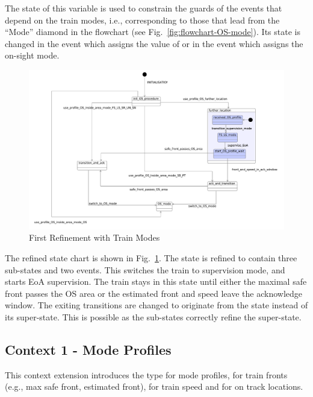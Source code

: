 \documentclass{template/openetcs_article}
\begin{document}
The state of this variable is used to constrain the guards of the events that
depend on the train modes, i.e., corresponding to those that lead from the
``Mode'' diamond in the flowchart (see Fig.~\ref{fig:flowchart-OS-mode}).
Its state is changed in the  event
which assigns the value of  or in the
 event which assigns the on-sight mode.

\begin{figure}[ht]
  \centering
  \includegraphics[width=.95\textwidth]{m1_train_modes_on_sight_procedure}
  \caption{First Refinement with Train Modes}
  \label{fig:first-refinement}
\end{figure}

The refined state chart is shown in Fig.~\ref{fig:first-refinement}. The state
 is refined to contain three sub-states and two
events. This switches the train to supervision mode, and starts EoA
supervision. The train stays in this state until either the maximal safe front
passes the OS area or the estimated front and speed leave the acknowledge
window. The exiting transitions are changed to originate from the
 state instead of its super-state. This is
possible as the sub-states correctly refine the super-state.

{\footnotesize

}

\subsection{Context 1 - Mode Profiles}
\label{sec:context-1-mode}

This context extension introduces the type  for mode
profiles,  for train fronts (e.g., max safe front,
estimated front),  for train speed and  for
on track locations.
\end{document}
